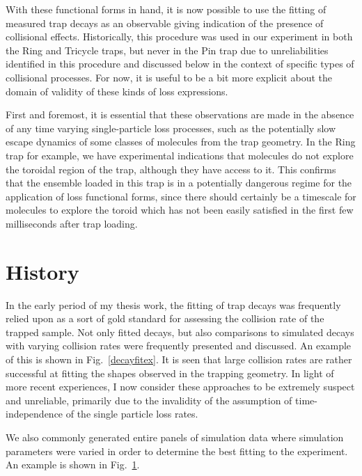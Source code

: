 With these functional forms in hand, it is now possible to use the fitting of measured trap decays as an observable giving indication of the presence of collisional effects.
Historically, this procedure was used in our experiment in both the Ring and Tricycle traps, but never in the Pin trap due to unreliabilities identified in this procedure and discussed below in the context of specific types of collisional processes.
For now, it is useful to be a bit more explicit about the domain of validity of these kinds of loss expressions.

First and foremost, it is essential that these observations are made in the absence of any time varying single-particle loss processes, such as the potentially slow escape dynamics of some classes of molecules from the trap geometry.
In the Ring trap for example, we have experimental indications that molecules do not explore the toroidal region of the trap, although they have access to it.
This confirms that the ensemble loaded in this trap is in a potentially dangerous regime for the application of loss functional forms, since there should certainly be a timescale for molecules to explore the toroid which has not been easily satisfied in the first few milliseconds after trap loading.

\section{History}

In the early period of my thesis work, the fitting of trap decays was frequently relied upon as a sort of gold standard for assessing the collision rate of the trapped sample.
Not only fitted decays, but also comparisons to simulated decays with varying collision rates were frequently presented and discussed.
An example of this is shown in Fig.~\ref{decayfitex}.
It is seen that large collision rates are rather successful at fitting the shapes observed in the trapping geometry.
In light of more recent experiences, I now consider these approaches to be extremely suspect and unreliable, primarily due to the invalidity of the assumption of time-independence of the single particle loss rates.


We also commonly generated entire panels of simulation data where simulation parameters were varied in order to determine the best fitting to the experiment.
An example is shown in Fig.~\ref{}.







\ifx\justbeingincluded\undefined

\fi
